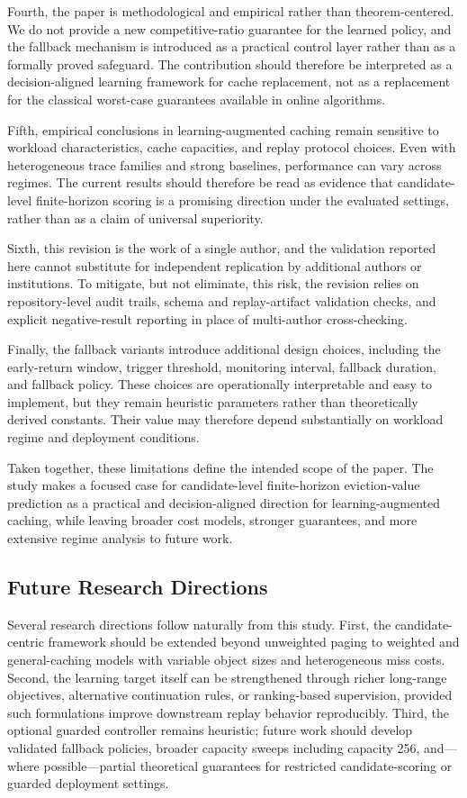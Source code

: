 \documentclass[preprint,12pt]{elsarticle}
\begin{document}
Fourth, the paper is methodological and empirical rather than theorem-centered. We do not provide a new competitive-ratio guarantee for the learned policy, and the fallback mechanism is introduced as a practical control layer rather than as a formally proved safeguard. The contribution should therefore be interpreted as a decision-aligned learning framework for cache replacement, not as a replacement for the classical worst-case guarantees available in online algorithms.

Fifth, empirical conclusions in learning-augmented caching remain sensitive to workload characteristics, cache capacities, and replay protocol choices. Even with heterogeneous trace families and strong baselines, performance can vary across regimes. The current results should therefore be read as evidence that candidate-level finite-horizon scoring is a promising direction under the evaluated settings, rather than as a claim of universal superiority.

Sixth, this revision is the work of a single author, and the validation reported here cannot substitute for independent replication by additional authors or institutions. To mitigate, but not eliminate, this risk, the revision relies on repository-level audit trails, schema and replay-artifact validation checks, and explicit negative-result reporting in place of multi-author cross-checking.

Finally, the fallback variants introduce additional design choices, including the early-return window, trigger threshold, monitoring interval, fallback duration, and fallback policy. These choices are operationally interpretable and easy to implement, but they remain heuristic parameters rather than theoretically derived constants. Their value may therefore depend substantially on workload regime and deployment conditions.

Taken together, these limitations define the intended scope of the paper. The study makes a focused case for candidate-level finite-horizon eviction-value prediction as a practical and decision-aligned direction for learning-augmented caching, while leaving broader cost models, stronger guarantees, and more extensive regime analysis to future work.

\subsection{Future Research Directions}
\label{subsec:future_research}

Several research directions follow naturally from this study. First, the candidate-centric framework should be extended beyond unweighted paging to weighted and general-caching models with variable object sizes and heterogeneous miss costs. Second, the learning target itself can be strengthened through richer long-range objectives, alternative continuation rules, or ranking-based supervision, provided such formulations improve downstream replay behavior reproducibly. Third, the optional guarded controller remains heuristic; future work should develop validated fallback policies, broader capacity sweeps including capacity 256, and---where possible---partial theoretical guarantees for restricted candidate-scoring or guarded deployment settings.
\end{document}
